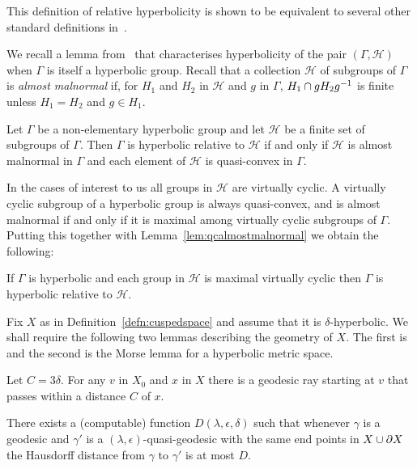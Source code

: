 This definition of relative hyperbolicity is shown to be equivalent to several
other standard definitions in~\cite{grovesmanning08}.

We recall a lemma from~\cite{bowditch12} that characterises hyperbolicity of
the pair $(\Gamma, \mathcal{H})$ when $\Gamma$ is itself a hyperbolic group.
Recall that a collection $\mathcal{H}$ of subgroups of $\Gamma$ is \emph{almost
malnormal} if, for $H_1$ and $H_2$ in $\mathcal{H}$ and $g$ in $\Gamma$, $H_1
\cap gH_2g^{-1}$ is finite unless $H_1 = H_2$ and $g \in H_1$.

\begin{lem}\label{lem:qcalmostmalnormal}\cite[Theorem 7.11]{bowditch12} Let
  $\Gamma$ be a non-elementary hyperbolic group and let $\mathcal{H}$ be a
  finite set of subgroups of $\Gamma$. Then $\Gamma$ is hyperbolic relative to
  $\mathcal{H}$ if and only if $\mathcal{H}$ is almost malnormal in $\Gamma$
and each element of $\mathcal{H}$ is quasi-convex in $\Gamma$.\end{lem}

In the cases of interest to us all groups in $\mathcal{H}$ are virtually
cyclic. A virtually cyclic subgroup of a hyperbolic group is always
quasi-convex, and is almost malnormal if and only if it is maximal among
virtually cyclic subgroups of $\Gamma$. Putting this together with
Lemma~\ref{lem:qcalmostmalnormal} we obtain the following:

\begin{lem}\label{lem:vcycperipheral} If $\Gamma$ is hyperbolic and each group
in $\mathcal{H}$ is maximal virtually cyclic then $\Gamma$ is hyperbolic
relative to $\mathcal{H}$.\end{lem}

Fix $X$ as in Definition~\ref{defn:cuspedspace} and assume that it is $\delta$-hyperbolic.
We shall require the following two lemmas describing the geometry of $X$. The
first is~\cite[Lemma 2.11]{dahmanigroves08a} and the second is the Morse lemma
for a hyperbolic metric space.

\begin{lem}\label{lem:closeray} Let $C = 3\delta$. For any $v$ in $X_0$ and $x$
in $X$ there is a geodesic ray starting at $v$ that passes within a distance
$C$ of $x$.\end{lem}

\begin{lem}\label{lem:uniformlyclose} There exists a (computable) function
$D(\lambda, \epsilon, \delta)$ such that whenever $\gamma$ is a geodesic and
$\gamma'$ is a $(\lambda, \epsilon)$-quasi-geodesic with the same end points in
$X \cup \partial X$ the Hausdorff distance from $\gamma$ to $\gamma'$ is at
most $D$. \end{lem}


